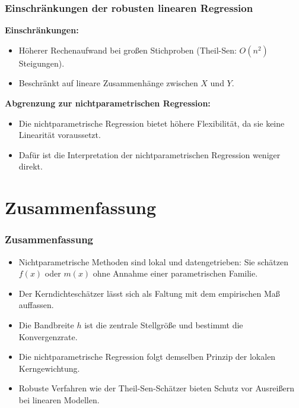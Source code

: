 \documentclass{beamer}
\newif\ifpauseswitch
\begin{document}
	
	\begin{frame}
		\frametitle{Einschränkungen der robusten linearen Regression}
		
		\textbf{Einschränkungen:}
		\begin{itemize}
			\itemsep8pt
			\item Höherer Rechenaufwand bei großen Stichproben (Theil-Sen: $O(n^2)$ Steigungen).
			\item Beschränkt auf lineare Zusammenhänge zwischen $X$ und $Y$.
		\end{itemize}
		
		\vspace{0.5em}
		
		\ifpauseswitch
		\pause
		\fi
		
		\textbf{Abgrenzung zur nichtparametrischen Regression:}
		\begin{itemize}
			\itemsep8pt
			\item Die nichtparametrische Regression bietet höhere Flexibilität, da sie keine Linearität voraussetzt.
			\item Dafür ist die Interpretation der nichtparametrischen Regression weniger direkt.
		\end{itemize}
	\end{frame}
	
	
	\section{Zusammenfassung}
	
	\begin{frame}
		\frametitle{Zusammenfassung}
		\hypertarget{nachrobust}{}
		
		\begin{itemize}
			\itemsep10pt
			\item Nichtparametrische Methoden sind lokal und datengetrieben: Sie schätzen $f(x)$ oder $m(x)$ ohne Annahme einer parametrischen Familie.
			\item Der Kerndichteschätzer lässt sich als Faltung mit dem empirischen Maß auffassen.
			\item Die Bandbreite $h$ ist die zentrale Stellgröße und bestimmt die Konvergenzrate.
			\item Die nichtparametrische Regression folgt demselben Prinzip der lokalen Kerngewichtung.
			\item Robuste Verfahren wie der Theil-Sen-Schätzer bieten Schutz vor Ausreißern bei linearen Modellen.
		\end{itemize}
	\end{frame}
	
\end{document}
